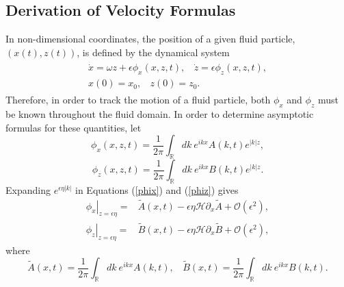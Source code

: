 \documentclass{JFM_Style/jfm}
\newcommand{\pd}{\partial}
\begin{document}
\subsection{Derivation of Velocity Formulas}
In non-dimensional coordinates, the position of a given fluid particle, $(x(t),z(t))$, is defined by the dynamical system 
\begin{align}
\begin{split}
\dot{x} = \omega z + \epsilon \phi_{x}(x,z,t), ~~~~ \dot{z} = \epsilon\phi_{z}(x,z,t),\\
x(0) =x_0,~~~~ z(0)=z_0.
\end{split}
\label{system}
\end{align}
Therefore, in order to track the motion of a fluid particle, both $\phi_x$ and $\phi_z$ must be known throughout the fluid domain.  In order to determine asymptotic formulas for these quantities, let
\begin{equation}
\phi_{x}(x,z,t) = \frac{1}{2\pi}\int_{\mathbb{R}}dk~ e^{ikx} A(k,t)e^{|k|z},
\label{phix}
\end{equation}
\begin{equation}
\phi_{z}(x,z,t) = \frac{1}{2\pi}\int_{\mathbb{R}}dk~ e^{ikx} B(k,t)e^{|k|z}.
\label{phiz}
\end{equation}
Expanding $e^{\epsilon \eta |k|}$ in Equations (\ref{phix}) and (\ref{phiz}) gives
\begin{align}
\left.\phi_{x}\right|_{z=\epsilon\eta} = & \tilde{A}(x,t) - \epsilon\eta\mathcal{H}\pd_{x}\tilde{A} +\mathcal{O}(\epsilon^{2}),\label{phixsurfsol}\\
\left.\phi_{z}\right|_{z=\epsilon\eta} = & \tilde{B}(x,t) - \epsilon\eta\mathcal{H}\pd_{x}\tilde{B} +\mathcal{O}(\epsilon^{2}),\label{phizsurfsol}
\end{align}
where
\[
\tilde{A}(x,t) = \frac{1}{2\pi}\int_{\mathbb{R}}dk~ e^{ikx} A(k,t), ~~~~ \tilde{B}(x,t) = \frac{1}{2\pi}\int_{\mathbb{R}}dk~ e^{ikx} B(k,t).
\]
\end{document}
